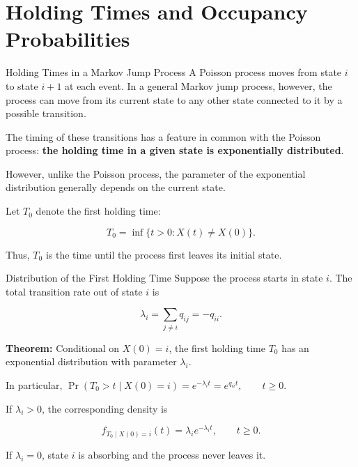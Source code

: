 \documentclass[
  ignorenonframetext,
  aspectratio=169,
]{beamer}
\begin{document}
\section{Holding Times and Occupancy
Probabilities}\label{holding-times-and-occupancy-probabilities}

\begin{frame}{Holding Times in a Markov Jump Process}
\protect{}\label{holding-times-in-a-markov-jump-process}
A Poisson process moves from state \(i\) to state \(i+1\) at each event.
In a general Markov jump process, however, the process can move from its
current state to any other state connected to it by a possible
transition.

The timing of these transitions has a feature in common with the Poisson
process: \textbf{the holding time in a given state is exponentially
distributed}.

However, unlike the Poisson process, the parameter of the exponential
distribution generally depends on the current state.

Let \(T_0\) denote the first holding time:

\[
T_0=\inf\{t>0:X(t)\neq X(0)\}.
\]

Thus, \(T_0\) is the time until the process first leaves its initial
state.
\end{frame}

\begin{frame}{Distribution of the First Holding Time}
\protect{}\label{distribution-of-the-first-holding-time}
Suppose the process starts in state \(i\). The total transition rate out
of state \(i\) is

\[
\lambda_i=\sum_{j\neq i}q_{ij}=-q_{ii}.
\]

\textbf{Theorem:} Conditional on \(X(0)=i\), the first holding time
\(T_0\) has an exponential distribution with parameter \(\lambda_i\).

In particular,
\(\boxed{\Pr(T_0>t\mid X(0)=i)=e^{-\lambda_i t}=e^{q_{ii}t},\qquad t\geq 0.}\)

If \(\lambda_i>0\), the corresponding density is

\[
f_{T_0\mid X(0)=i}(t)
=\lambda_i e^{-\lambda_i t},
\qquad t\geq 0.
\]

If \(\lambda_i=0\), state \(i\) is absorbing and the process never
leaves it.
\end{frame}
\end{document}
